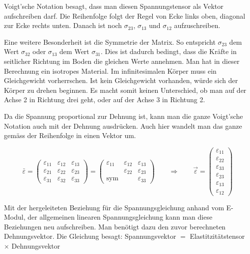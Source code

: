 Voigt'sche Notation besagt, dass man diesen Spannungstensor als Vektor aufschreiben darf.
Die Reihenfolge folgt der Regel von Ecke links oben, diagonal zur Ecke rechts unten.
Danach ist noch $\sigma_{23}$, $\sigma_{13}$ und $\sigma_{12}$ aufzuschreiben.

Eine weitere Besonderheit ist die Symmetrie der Matrix.
So entspricht $\sigma_{23}$ dem Wert $\sigma_{32}$ oder $\sigma_{13}$ dem Wert $\sigma_{31}$.
Dies ist dadurch bedingt, dass die Kräfte in seitlicher Richtung im Boden die gleichen Werte annehmen.
Man hat in dieser Berechnung ein isotropes Material.
Im infinitesimalen Körper muss ein Gleichgewicht vorherrschen.
Ist kein Gleichgewicht vorhanden, würde sich der Körper zu drehen beginnen.
Es macht somit keinen Unterschied, ob man auf der Achse 2 in Richtung drei geht,
oder auf der Achse 3 in Richtung 2.

Da die Spannung proportional zur Dehnung ist, kann man die ganze Voigt'sche Notation auch mit der Dehnung ausdrücken.
Auch hier wandelt man das ganze gemäss der Reihenfolge in einen Vektor um.

\[
\bar{\varepsilon}
=
\begin{pmatrix}
	\varepsilon_{11} & \varepsilon_{12} & \varepsilon_{13} \\ 
	\varepsilon_{21} & \varepsilon_{22} & \varepsilon_{23} \\
	\varepsilon_{31} & \varepsilon_{32} & \varepsilon_{33}
\end{pmatrix}
=
\begin{pmatrix}
	\varepsilon_{11} & \varepsilon_{12} & \varepsilon_{13} \\ 
	                 & \varepsilon_{22} & \varepsilon_{23} \\
	\text{sym}       &                  & \varepsilon_{33}
\end{pmatrix}
\qquad
\Rightarrow
\qquad
\vec{\varepsilon}
=
\begin{pmatrix}
	\varepsilon_{11} \\
	\varepsilon_{22} \\
	\varepsilon_{33} \\
	\varepsilon_{23} \\
	\varepsilon_{13} \\
	\varepsilon_{12}
\end{pmatrix}
\]


Mit der hergeleiteten Beziehung für die Spannungsgleichung anhand vom E-Modul,
der allgemeinen linearen Spannungsgleichung kann man diese Beziehungen neu aufschreiben.
Man benötigt dazu den zuvor berechneten Dehnungsvektor.
Die Gleichung besagt:
Spannungsvektor $=$ Elastitzitätstensor $\times$ Dehnungsvektor

